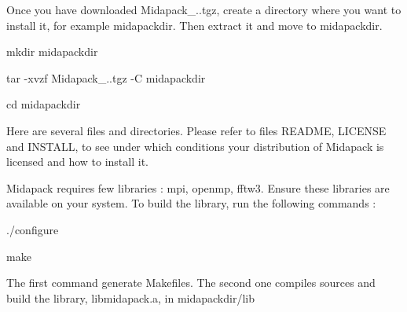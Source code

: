 Once you have downloaded Midapack\-\_..\-tgz, create a directory where you want to install it, for example midapackdir. Then extract it and move to midapackdir.
\begin{DoxyItemize}
\item mkdir midapackdir
\item tar -\/xvzf Midapack\-\_..\-tgz -\/\-C midapackdir
\item cd midapackdir
\end{DoxyItemize}

Here are several files and directories. Please refer to files R\-E\-A\-D\-M\-E, L\-I\-C\-E\-N\-S\-E and I\-N\-S\-T\-A\-L\-L, to see under which conditions your distribution of Midapack is licensed and how to install it.

Midapack requires few libraries \-: mpi, openmp, fftw3. Ensure these libraries are available on your system. To build the library, run the following commands \-:
\begin{DoxyItemize}
\item ./configure
\item make
\end{DoxyItemize}

The first command generate Makefiles. The second one compiles sources and build the library, libmidapack.\-a, in midapackdir/lib 